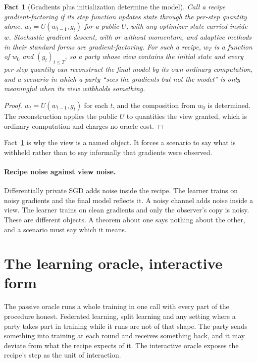 \documentclass[11pt]{article}
\theoremstyle{definition}
\theoremstyle{plain}
\newtheorem{fact}{Fact}
\theoremstyle{remark}
\begin{document}
\begin{fact}[Gradients plus initialization determine the model]
\label{fact:determine}
Call a recipe \emph{gradient-factoring} if its step function updates state
through the per-step quantity alone, $w_t = U(w_{t-1}, g_t)$ for a public $U$,
with any optimizer state carried inside $w$. Stochastic gradient descent, with
or without momentum, and adaptive methods in their standard forms are
gradient-factoring. For such a recipe, $w_T$ is a function of $w_0$ and
$(g_t)_{t \le T}$, so a party whose view contains the initial state and every
per-step quantity can reconstruct the final model by its own ordinary
computation, and a scenario in which a party ``sees the gradients but not the
model'' is only meaningful when its view withholds something.
\end{fact}

\begin{proof}
$w_t = U(w_{t-1}, g_t)$ for each $t$, and the composition from $w_0$ is
determined. The reconstruction applies the public $U$ to quantities the view
granted, which is ordinary computation and charges no oracle cost.
\end{proof}

Fact~\ref{fact:determine} is why the view is a named object. It forces a scenario
to say what is withheld rather than to say informally that gradients were observed.

\paragraph{Recipe noise against view noise.} Differentially private SGD adds noise
inside the recipe. The learner trains on noisy gradients and the final model
reflects it. A noisy channel adds noise inside a view. The learner trains on clean
gradients and only the observer's copy is noisy. These are different objects. A
theorem about one says nothing about the other, and a scenario must say which it
means.

\section{The learning oracle, interactive form}
\label{sec:interactive}

The passive oracle runs a whole training in one call with every part of the
procedure honest. Federated learning, split learning and any setting where a party
takes part in training while it runs are not of that shape. The party sends
something into training at each round and receives something back, and it may
deviate from what the recipe expects of it. The interactive oracle exposes the
recipe's step as the unit of interaction.
\end{document}
